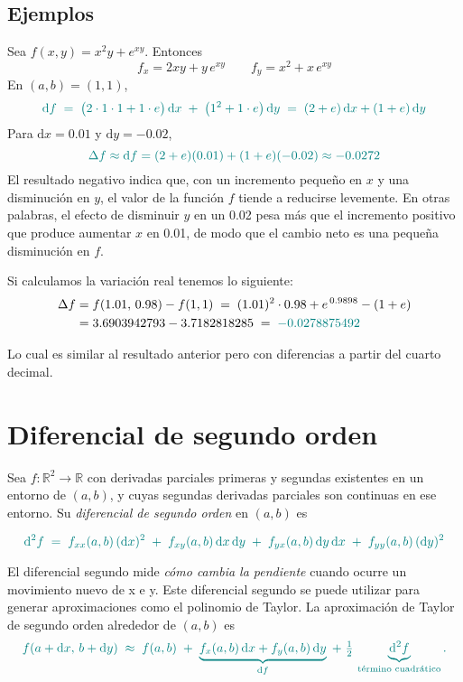 \documentclass{article}
\begin{document}
\subsection*{Ejemplos}
Sea \(f(x,y)=x^{2}y + e^{xy}\). Entonces
\[
f_x=2xy + y\,e^{xy}\qquad f_y=x^2 + x\,e^{xy}
\]
En \((a,b)=(1,1)\),
\[
\color{teal}
\mathrm{d}f \;=\; \bigl(2\cdot1\cdot1 + 1\cdot e\bigr)\,\mathrm{d}x \;+\; \bigl(1^2 + 1\cdot e\bigr)\,\mathrm{d}y
\;=\; (2+e)\,\mathrm{d}x + (1+e)\,\mathrm{d}y
\]
Para \(\mathrm{d}x=0.01\) y \(\mathrm{d}y=-0.02\),
\[ \color{teal}
\Delta f \approx \mathrm{d}f = (2+e)(0.01) + (1+e)(-0.02) \approx -0.0272
\]
El resultado negativo indica que, con un incremento pequeño en \(x\) y una disminución en \(y\), el valor de la función \(f\) tiende a reducirse levemente.
En otras palabras, el efecto de disminuir \(y\) en un 0.02 pesa más que el incremento positivo que produce aumentar \(x\) en 0.01, de modo que el cambio neto es una pequeña disminución en \(f\).

Si calculamos la variación real tenemos lo siguiente:
\[
\begin{aligned}
\Delta f &= f(1.01,\,0.98)-f(1,1) \;=\; (1.01)^2\cdot 0.98 + e^{\,0.9898} - (1+e) \\
         &= 3.6903942793 - 3.7182818285 \;=\; \color{teal}{-0.0278875492}
\end{aligned}
\]

Lo cual es similar al resultado anterior pero con diferencias a partir del cuarto decimal.



\section*{Diferencial de segundo orden}
Sea \(f:\mathbb{R}^2\to\mathbb{R}\) con derivadas parciales primeras y segundas existentes en un entorno de \((a,b)\), y cuyas segundas derivadas parciales son continuas en ese entorno. Su \emph{diferencial de segundo orden} en \((a,b)\) es

\[
\color{teal}
\mathrm{d}^2 f
\;=\;
f_{xx}(a,b)\,(\mathrm{d}x)^2
\;+\; f_{xy}(a,b)\,\mathrm{d}x\,\mathrm{d}y
\;+\; f_{yx}(a,b)\,\mathrm{d}y\,\mathrm{d}x
\;+\; f_{yy}(a,b)\,(\mathrm{d}y)^2 
\]

El diferencial segundo mide \emph{cómo cambia la pendiente} cuando ocurre un movimiento nuevo de x e y. Este diferencial segundo se puede utilizar para generar aproximaciones como el polinomio de Taylor. La aproximación de Taylor de segundo orden alrededor de \((a,b)\) es
\[
\color{teal}
f(a+\mathrm{d}x,\,b+\mathrm{d}y)
\;\approx\;
f(a,b)
\;+\; \underbrace{f_x(a,b)\,\mathrm{d}x + f_y(a,b)\,\mathrm{d}y}_{\mathrm{d}f}
\;+\; \tfrac{1}{2}\,\underbrace{\mathrm{d}^2 f}_{\text{término cuadrático}}.
\]
\end{document}
